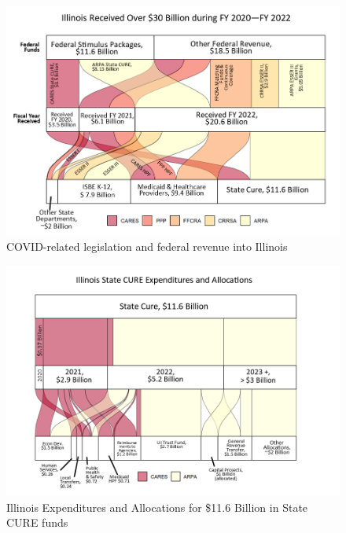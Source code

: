 \documentclass[
  letterpaper,
  DIV=11,
  numbers=noendperiod]{scrreport}
\begin{document}
\begin{figure}

{\centering \includegraphics{./images/federal-covid-revenues.png}

}

\caption{\label{fig-rev-to-illinois}COVID-related legislation and
federal revenue into Illinois}

\end{figure}

\begin{figure}

{\centering \includegraphics{./images/cure-expenditures.png}

}

\caption{\label{fig-stateCURE-expenditures}Illinois Expenditures and
Allocations for \$11.6 Billion in State CURE funds}

\end{figure}
\end{document}
